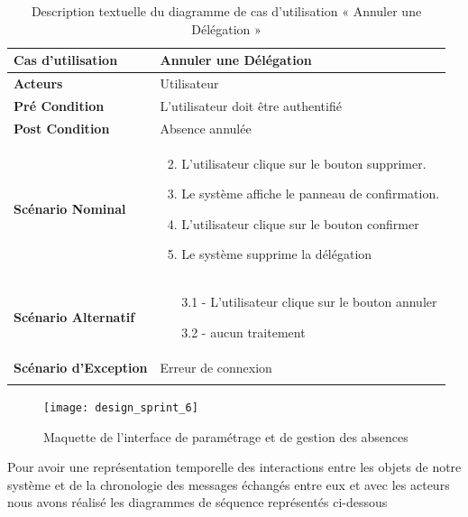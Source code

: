 \begin{longtable}{|p{5cm}|p{10cm}|}
\hline
\textbf{Cas d'utilisation}&Annuler une Délégation       \\
\hline
\textbf{Acteurs}&Utilisateur\\
\hline
\textbf{Pré Condition}&L'utilisateur doit être authentifié\\
\hline
\textbf{Post Condition}&Absence annulée \\
\hline
\textbf{Scénario Nominal}&
\vspace{-\baselineskip}
\begin{enumerate}
  \setcounter{enumi}{1}
  \item L'utilisateur clique sur le bouton supprimer.
  \item Le système affiche le panneau de confirmation.
  \item L'utilisateur clique sur le bouton confirmer
  \item Le système supprime la délégation 
\end{enumerate}\\
\hline
\textbf{Scénario Alternatif}&
\vspace{-\baselineskip}
\begin{enumerate}
  \item [3.1]- L'utilisateur clique sur le bouton annuler
  \item [3.2]- aucun traitement
\end{enumerate}\\
\hline
\textbf{Scénario d'Exception}&
Erreur de connexion\\
\hline
\caption{Description textuelle du diagramme de cas d'utilisation « Annuler une Délégation       »}
\label{tab:use_case_cancel_delegate}
\end{longtable}

\begin{figure}[H]
  \centering
  \texttt{[image: design\_sprint\_6]}
  \caption{Maquette de l'interface de paramétrage et de gestion des absences}
  \label{fig:MaquetteInterfaceParametrageGestionAbsences}
\end{figure}


Pour avoir une représentation temporelle des interactions entre les objets de notre système et de la chronologie des messages échangés entre eux et avec les acteurs nous avons réalisé les diagrammes de séquence représentés ci-dessous

